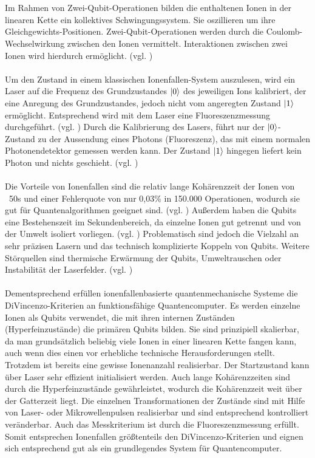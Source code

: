 \\
\\
Im Rahmen von Zwei-Qubit-Operationen bilden die enthaltenen Ionen in der linearen Kette ein kollektives Schwingungssystem. Sie oszillieren um ihre Gleichgewichts-Positionen. Zwei-Qubit-Operationen werden durch die Coulomb-Wechselwirkung zwischen den Ionen vermittelt. Interaktionen zwischen zwei Ionen wird hierdurch ermöglicht. (vgl. \cite[Ch. 21.1]{lapierre_introduction_2021}) %
\\
\\
Um den Zustand in einem klassischen Ionenfallen-System auszulesen, wird ein Laser auf die Frequenz des Grundzustandes $\ket0$ des jeweiligen Ions kalibriert, der eine Anregung des Grundzustandes, jedoch nicht vom angeregten Zustand $\ket1$ ermöglicht. Entsprechend wird mit dem Laser eine Fluoreszenzmessung durchgeführt. (vgl. \cite[Ch 21.1]{lapierre_introduction_2021})
Durch die Kalibrierung des Lasers, führt nur der $\ket0$-Zustand zu der Aussendung eines Photons (Fluoreszenz), das mit einem normalen Photonendetektor gemessen werden kann. Der Zustand $\ket1$ hingegen liefert kein Photon und nichts geschieht. (vgl. \cite[Ch 21.1]{lapierre_introduction_2021}) %
\\
\\
Die Vorteile von Ionenfallen sind die relativ lange Kohärenzzeit der Ionen von ~50s und einer Fehlerquote von nur 0,03\% in 150.000 Operationen, wodurch sie gut für Quantenalgorithmen geeignet sind. (vgl. \cite[Ch. 4.6.1]{kasirajan_fundamentals_2021})
Außerdem haben die Qubits eine Bestehenszeit im Sekundenbereich, da einzelne Ionen gut getrennt und von der Umwelt isoliert vorliegen. (vgl. \cite[Ch 21.1]{lapierre_introduction_2021})
Problematisch sind jedoch die Vielzahl an sehr präzisen Lasern und das technisch komplizierte Koppeln von Qubits. Weitere Störquellen sind thermische Erwärmung der Qubits, Umweltrauschen oder Instabilität der Laserfelder. (vgl. \cite[Ch. 4.6.1]{kasirajan_fundamentals_2021}) 
\\
\\
Dementsprechend erfüllen ionenfallenbasierte quantenmechanische Systeme die DiVincenzo-Kriterien an funktionsfähige Quantencomputer.
Es werden einzelne Ionen als Qubits verwendet, die mit ihren internen Zuständen (Hyperfeinzustände) die primären Qubits bilden. Sie sind prinzipiell skalierbar, da man grundsätzlich beliebig viele Ionen in einer linearen Kette fangen kann, auch wenn dies einen vor erhebliche technische Herausforderungen stellt. Trotzdem ist bereits eine gewisse Ionenanzahl realisierbar.
Der Startzustand kann über Laser sehr effizient initialisiert werden. Auch lange Kohärenzzeiten sind durch die Hyperfeinzustände gewährleistet, wodurch die Kohärenzzeit weit über der Gatterzeit liegt.
Die einzelnen Transformationen der Zustände sind mit Hilfe von Laser- oder Mikrowellenpulsen realisierbar und sind entsprechend kontrolliert veränderbar.
Auch das Messkriterium ist durch die Fluoreszenzmessung erfüllt. Somit entsprechen Ionenfallen größtenteils den DiVincenzo-Kriterien und eignen sich entsprechend gut als ein grundlegendes System für Quantencomputer. 


